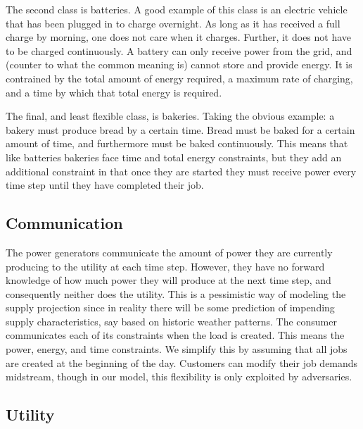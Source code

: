 \documentclass[conference]{IEEEtran}
\begin{document}
The second class is batteries. A good example of this class is an electric vehicle that has been plugged in to charge overnight. As long as it has received a full charge by morning, one does not care when it charges. Further, it does not have to be charged continuously. A battery can only receive power from the grid, and (counter to what the common meaning is) cannot store and provide energy. It is contrained by the total amount of energy required, a maximum rate of charging, and a time by which that total energy is required.

The final, and least flexible class, is bakeries. Taking the obvious example: a bakery must produce bread by a certain time. Bread must be baked for a certain amount of time, and furthermore must be baked continuously. This means that like batteries bakeries face time and total energy constraints, but they add an additional constraint in that once they are started they must receive power every time step until they have completed their job.

\subsection{Communication}
\label{Communication}

The power generators communicate the amount of power they are currently producing to the utility at each time step. However, they have no forward knowledge of how much power they will produce at the next time step, and consequently neither does the utility. This is a pessimistic way of modeling the supply projection since in reality there will be some prediction of impending supply characteristics, say based on historic weather patterns. The consumer communicates each of its constraints when the load is created. This means the power, energy, and time constraints. We simplify this by assuming that all jobs are created at the beginning of the day. Customers can modify their job demands midstream, though in our model, this flexibility is only exploited by adversaries.

\subsection{Utility}
\label{Utility}
\end{document}
